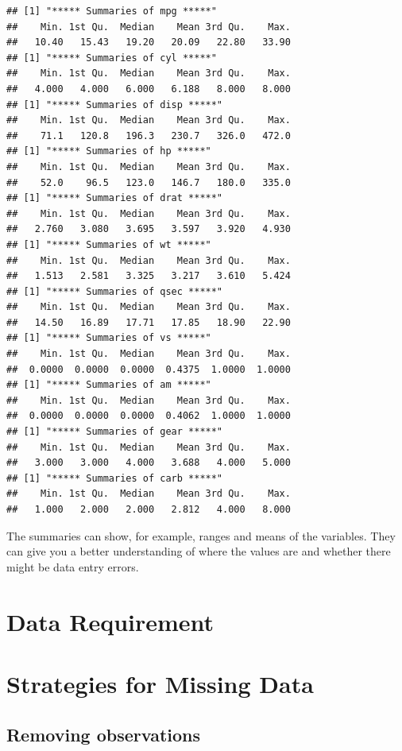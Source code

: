 \documentclass[
]{book}
\begin{document}
\begin{verbatim}
## [1] "***** Summaries of mpg *****"
##    Min. 1st Qu.  Median    Mean 3rd Qu.    Max. 
##   10.40   15.43   19.20   20.09   22.80   33.90 
## [1] "***** Summaries of cyl *****"
##    Min. 1st Qu.  Median    Mean 3rd Qu.    Max. 
##   4.000   4.000   6.000   6.188   8.000   8.000 
## [1] "***** Summaries of disp *****"
##    Min. 1st Qu.  Median    Mean 3rd Qu.    Max. 
##    71.1   120.8   196.3   230.7   326.0   472.0 
## [1] "***** Summaries of hp *****"
##    Min. 1st Qu.  Median    Mean 3rd Qu.    Max. 
##    52.0    96.5   123.0   146.7   180.0   335.0 
## [1] "***** Summaries of drat *****"
##    Min. 1st Qu.  Median    Mean 3rd Qu.    Max. 
##   2.760   3.080   3.695   3.597   3.920   4.930 
## [1] "***** Summaries of wt *****"
##    Min. 1st Qu.  Median    Mean 3rd Qu.    Max. 
##   1.513   2.581   3.325   3.217   3.610   5.424 
## [1] "***** Summaries of qsec *****"
##    Min. 1st Qu.  Median    Mean 3rd Qu.    Max. 
##   14.50   16.89   17.71   17.85   18.90   22.90 
## [1] "***** Summaries of vs *****"
##    Min. 1st Qu.  Median    Mean 3rd Qu.    Max. 
##  0.0000  0.0000  0.0000  0.4375  1.0000  1.0000 
## [1] "***** Summaries of am *****"
##    Min. 1st Qu.  Median    Mean 3rd Qu.    Max. 
##  0.0000  0.0000  0.0000  0.4062  1.0000  1.0000 
## [1] "***** Summaries of gear *****"
##    Min. 1st Qu.  Median    Mean 3rd Qu.    Max. 
##   3.000   3.000   4.000   3.688   4.000   5.000 
## [1] "***** Summaries of carb *****"
##    Min. 1st Qu.  Median    Mean 3rd Qu.    Max. 
##   1.000   2.000   2.000   2.812   4.000   8.000
\end{verbatim}

The summaries can show, for example, ranges and means of the variables. They can give you a better understanding of where the values are and whether there might be data entry errors.

\hypertarget{data-requirement}{%
\section{Data Requirement}\label{data-requirement}}

\hypertarget{strategies-for-missing-data}{%
\section{Strategies for Missing Data}\label{strategies-for-missing-data}}

\hypertarget{removing-observations}{%
\subsection{Removing observations}\label{removing-observations}}
\end{document}
